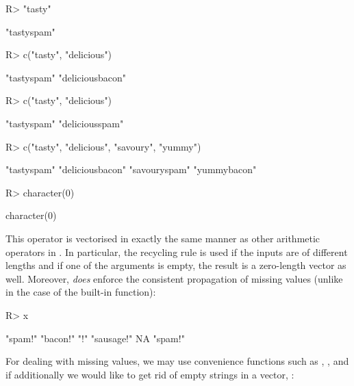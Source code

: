 \documentclass[nojss]{jss}
\begin{document}
\begin{Schunk}
\begin{Sinput}
R> "tasty" %s+% "spam"
\end{Sinput}
\begin{Soutput}
[1] "tastyspam"
\end{Soutput}
\begin{Sinput}
R> c("tasty", "delicious") %s+% c("spam", "bacon")  # elementwise
\end{Sinput}
\begin{Soutput}
[1] "tastyspam"      "deliciousbacon"
\end{Soutput}
\begin{Sinput}
R> c("tasty", "delicious") %s+% "spam"              # recycling rule
\end{Sinput}
\begin{Soutput}
[1] "tastyspam"     "deliciousspam"
\end{Soutput}
\begin{Sinput}
R> c("tasty", "delicious", "savoury", "yummy") %s+% c("spam", "bacon")
\end{Sinput}
\begin{Soutput}
[1] "tastyspam"      "deliciousbacon" "savouryspam"    "yummybacon"
\end{Soutput}
\begin{Sinput}
R> character(0) %s+% c("spam", "bacon")
\end{Sinput}
\begin{Soutput}
character(0)
\end{Soutput}
\end{Schunk}

This operator is vectorised in exactly the same manner
as other arithmetic operators in .
In particular, the recycling rule is used if the inputs are of different
lengths and if one of the arguments is empty, the result is a zero-length
vector as well. Moreover,  \textit{does} enforce the consistent
propagation of missing values
(unlike in the case of the built-in 
function):

\begin{Schunk}
\begin{Sinput}
R> x %s+% "!"
\end{Sinput}
\begin{Soutput}
[1] "spam!"    "bacon!"   "!"        "sausage!" NA         "spam!"
\end{Soutput}
\end{Schunk}

\noindent
For dealing with missing values, we may use convenience functions such as
, ,
and
 if additionally we would like to get rid
of empty strings in a vector,
:
\end{document}
